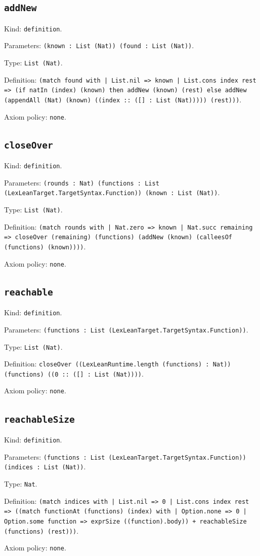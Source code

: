 \documentclass[11pt]{article}
\begin{document}
\subsection*{\texttt{addNew}}
\noindent Kind: \texttt{definition}.\par
\noindent Parameters: \texttt{(known : List (Nat)) (found : List (Nat))}.\par
\noindent Type: \texttt{List (Nat)}.\par
\noindent Definition: \texttt{(match found with | List.nil => known | List.cons index rest => (if natIn (index) (known) then addNew (known) (rest) else addNew (appendAll (Nat) (known) ((index :: ([] : List (Nat))))) (rest)))}.\par
\noindent Axiom policy: \texttt{none}.\par
\subsection*{\texttt{closeOver}}
\noindent Kind: \texttt{definition}.\par
\noindent Parameters: \texttt{(rounds : Nat) (functions : List (LexLeanTarget.TargetSyntax.Function)) (known : List (Nat))}.\par
\noindent Type: \texttt{List (Nat)}.\par
\noindent Definition: \texttt{(match rounds with | Nat.zero => known | Nat.succ remaining => closeOver (remaining) (functions) (addNew (known) (calleesOf (functions) (known))))}.\par
\noindent Axiom policy: \texttt{none}.\par
\subsection*{\texttt{reachable}}
\noindent Kind: \texttt{definition}.\par
\noindent Parameters: \texttt{(functions : List (LexLeanTarget.TargetSyntax.Function))}.\par
\noindent Type: \texttt{List (Nat)}.\par
\noindent Definition: \texttt{closeOver ((LexLeanRuntime.length (functions) : Nat)) (functions) ((0 :: ([] : List (Nat))))}.\par
\noindent Axiom policy: \texttt{none}.\par
\subsection*{\texttt{reachableSize}}
\noindent Kind: \texttt{definition}.\par
\noindent Parameters: \texttt{(functions : List (LexLeanTarget.TargetSyntax.Function)) (indices : List (Nat))}.\par
\noindent Type: \texttt{Nat}.\par
\noindent Definition: \texttt{(match indices with | List.nil => 0 | List.cons index rest => ((match functionAt (functions) (index) with | Option.none => 0 | Option.some function => exprSize ((function).body)) + reachableSize (functions) (rest)))}.\par
\noindent Axiom policy: \texttt{none}.\par
\end{document}
